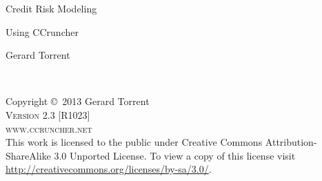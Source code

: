 \documentclass[11pt,fleqn]{book} %
\begin{document}

\begingroup
\thispagestyle{empty}
\centering
\vspace*{8cm}
\par\normalfont\fontsize{35}{35}\sffamily\selectfont
Credit Risk Modeling \par %
\par\normalfont\fontsize{25}{25}\sffamily\selectfont
Using CCruncher\par
\vspace*{2cm}
{\Huge Gerard Torrent}\par %
\endgroup


\newpage
~\vfill
\thispagestyle{empty}

\noindent Copyright \copyright\ 2013 Gerard Torrent\\ %

\noindent \textsc{Version 2.3 [R1023]}\\ 

\noindent \textsc{www.ccruncher.net}\\ %

\noindent 
This work is licensed to the public under Creative Commons Attribution-ShareAlike 3.0 Unported License. 
To view a copy of this license visit \url{http://creativecommons.org/licenses/by-sa/3.0/}.

\begin{comment}
Licensed under the Creative Commons Attribution-ShareAlike 3.0 Unported License 
(the ``License''). You may not use this file except in compliance with the License. 
You may obtain a copy of the License at \url{http://creativecommons.org/licenses/by-sa/3.0/}. 
Unless required by applicable law or agreed to in writing, software distributed under 
the License is distributed on an \textsc{``AS IS'' BASIS, WITHOUT WARRANTIES OR CONDITIONS 
OF ANY KIND}, either express or implied. See the License for the specific language governing 
permissions and limitations under the License.\\ %
\end{comment}
\end{document}

